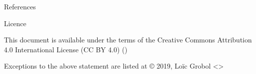 \documentclass[hyperref={unicode}, xcolor={svgnames}, french]{beamer}
\begin{document}
\begin{frame}[allowframebreaks]{References}
    \printbibliography[heading=none]
\end{frame}

\begin{frame}{Licence}
    \begin{center}
        {\huge \ccby}
        \vfill
        This document is available under the terms of the Creative Commons Attribution 4.0 International License (CC BY 4.0) ()

        Exceptions to the above statement are listed at {\small{}}
        \vfill
        © 2019, Loïc Grobol <>

    \end{center}
\end{frame}
\end{document}
